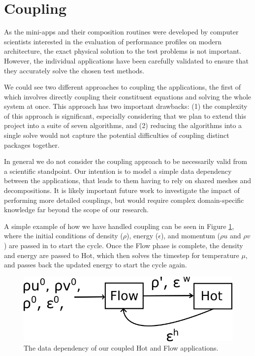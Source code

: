 \documentclass[runningheads,a4paper]{llncs}
\begin{document}
\section{Coupling}

As the mini-apps and their composition routines were developed by computer scientists interested in the evaluation of performance profiles on modern architecture, the exact physical solution to the test problems is not important. However, the individual applications have been carefully validated to ensure that they accurately solve the chosen test methods.

We could see two different approaches to coupling the applications, the first of which involves directly coupling their constituent equations and solving the whole system at once. This approach has two important drawbacks: (1) the complexity of this approach is significant, especially considering that we plan to extend this project into a suite of seven algorithms, and (2) reducing the algorithms into a single solve would not capture the potential difficulties of coupling distinct packages together.

In general we do not consider the coupling approach to be necessarily valid from a scientific standpoint. Our intention is to model a simple data dependency between the applications, that leads to them having to rely on shared meshes and decompositions. It is likely important future work to investigate the impact of performing more detailed couplings, but would require complex domain-specific knowledge far beyond the scope of our research. 

A simple example of how we have handled coupling can be seen in Figure \ref{fig:hot-flow-flow}, where the initial conditions of density ($\rho$), energy ($\epsilon$), and momentum ($\rho u$ and $\rho v$) are passed in to start the cycle. Once the Flow phase is complete, the density and energy are passed to Hot, which then solves the timestep for temperature $\mu$, and passes back the updated energy to start the cycle again.

\begin{figure}
  \centering
  \includegraphics[width=0.6\linewidth]{hot-flow-flow}
  \caption{The data dependency of our coupled Hot and Flow applications.}
  \label{fig:hot-flow-flow}
\end{figure}
\end{document}
